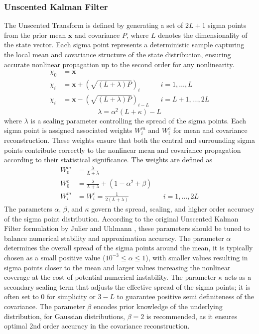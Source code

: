 \subsubsection{Unscented Kalman Filter}
The Unscented Transform is defined by generating a set of $2L + 1$ sigma points from the prior mean $\mathbf{x}$ and covariance $P$, where $L$ denotes the dimensionality of the state vector. Each sigma point represents a deterministic sample capturing the local mean and covariance structure of the state distribution, ensuring accurate nonlinear propagation up to the second order for any nonlinearity.
$$
\begin{aligned}
    \chi_0 &= \mathbf{x} \\
    \chi_i &= \mathbf{x} + (\sqrt{(L + \lambda)P})_i              && i = 1, \ldots, L \\
    \chi_i &= \mathbf{x} - (\sqrt{(L + \lambda)P})_{i - L}        && i = L+1, \ldots, 2L
\end{aligned}
$$
$$
    \lambda = \alpha^2 (L + \kappa) - L
$$
where $\lambda$ is a scaling parameter controlling the spread of the sigma points. Each sigma point is assigned associated weights $W_i^m$ and $W_i^c$ for mean and covariance reconstruction. These weights ensure that both the central and surrounding sigma points contribute correctly to the nonlinear mean and covariance propagation according to their statistical significance. The weights are defined as
$$
\begin{aligned}
    W_0^m &= \frac{\lambda}{L + \lambda} \\
    W_0^c &= \frac{\lambda}{L + \lambda} + (1 - \alpha^2 + \beta) \\
    W_i^m &= W_i^c = \frac{1}{2(L + \lambda)}                           && i = 1, \ldots, 2L
\end{aligned}
$$
The parameters $\alpha$, $\beta$, and $\kappa$ govern the spread, scaling, and higher order accuracy of the sigma point distribution. According to the original Unscented Kalman Filter formulation by Julier and Uhlmann \cite{ukf}, these parameters should be tuned to balance numerical stability and approximation accuracy. The parameter $\alpha$ determines the overall spread of the sigma points around the mean, it is typically chosen as a small positive value ($10^{-3} \leq \alpha \leq 1$), with smaller values resulting in sigma points closer to the mean and larger values increasing the nonlinear coverage at the cost of potential numerical instability. The parameter $\kappa$ acts as a secondary scaling term that adjusts the effective spread of the sigma points; it is often set to $0$ for simplicity or $3 - L$ to guarantee positive semi definiteness of the covariance. The parameter $\beta$ encodes prior knowledge of the underlying distribution, for Gaussian distributions, $\beta = 2$ is recommended, as it ensures optimal 2nd order accuracy in the covariance reconstruction. 
